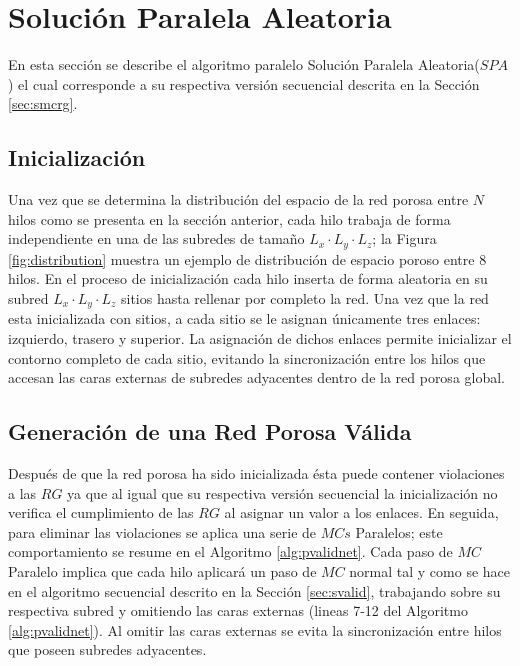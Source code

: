 \section{Solución Paralela Aleatoria}
\label{sec:pbiasedrg}
En esta sección se describe el algoritmo paralelo Solución Paralela Aleatoria($SPA$) el cual corresponde a su respectiva versión secuencial descrita en la Sección \ref{sec:smcrg}.

\subsection{Inicialización}
\label{subsec:pbiasedrginit}
Una vez que se determina la distribución del espacio de la red porosa entre $N$ hilos como se presenta 
en la sección anterior, cada hilo trabaja de forma independiente en una de las subredes de tamaño $L_x \cdot L_y \cdot L_z$; 
la Figura \ref{fig:distribution} muestra un ejemplo de distribución de espacio poroso entre $8$ hilos.
En el proceso de inicialización cada hilo inserta de forma aleatoria en su subred $L_x \cdot L_y \cdot L_z$ sitios 
hasta rellenar por completo la red. Una vez que la red esta inicializada con sitios, a cada sitio se le asignan únicamente tres 
enlaces: izquierdo, trasero y superior. La asignación de dichos enlaces permite inicializar el contorno completo de cada
sitio, evitando la sincronización entre los hilos que accesan las caras externas de subredes adyacentes dentro de la red porosa global.

\subsection{Generación de una Red Porosa Válida}
\label{subsec:pbiasedrgvalid}
Después de que la red porosa ha sido inicializada ésta puede contener violaciones a las $RG$ ya que al igual que su respectiva versión secuencial la inicialización no verifica el cumplimiento de las $RG$ al asignar un valor a los enlaces. En seguida, para eliminar las violaciones se aplica una serie de $MCs$ Paralelos; este comportamiento se resume en el Algoritmo \ref{alg:pvalidnet}. Cada paso de $MC$ Paralelo implica que cada hilo  aplicará un paso de $MC$ normal tal y como se hace en el algoritmo secuencial descrito en la Sección \ref{sec:svalid}, trabajando sobre su respectiva subred y omitiendo las caras  externas (lineas 7-12 del Algoritmo \ref{alg:pvalidnet}). Al omitir las caras externas se evita la sincronización entre hilos que poseen subredes adyacentes.\\

